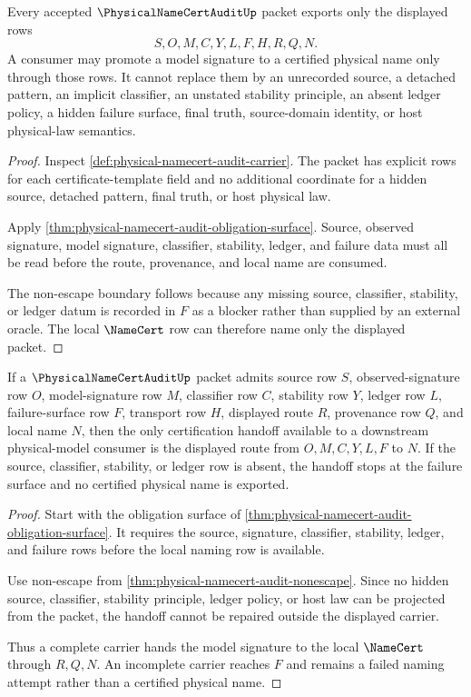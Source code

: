 \begin{theorem}
\label{thm:physical-namecert-audit-nonescape}
Every accepted $\PhysicalNameCertAuditUp$ packet exports only the displayed rows
$$
S,O,M,C,Y,L,F,H,R,Q,N.
$$
A consumer may promote a model signature to a certified physical name only through those rows. It cannot replace them by an unrecorded source, a detached pattern, an implicit classifier, an unstated stability principle, an absent ledger policy, a hidden failure surface, final truth, source-domain identity, or host physical-law semantics.
\end{theorem}
\begin{proof}
Inspect \autoref{def:physical-namecert-audit-carrier}. The packet has explicit rows for each certificate-template field and no additional coordinate for a hidden source, detached pattern, final truth, or host physical law.

Apply \autoref{thm:physical-namecert-audit-obligation-surface}. Source, observed signature, model signature, classifier, stability, ledger, and failure data must all be read before the route, provenance, and local name are consumed.

The non-escape boundary follows because any missing source, classifier, stability, or ledger datum is recorded in $F$ as a blocker rather than supplied by an external oracle. The local $\NameCert$ row can therefore name only the displayed packet.
\end{proof}

\begin{theorem}
\label{thm:physical-namecert-audit-certification-handoff}
If a $\PhysicalNameCertAuditUp$ packet admits source row $S$, observed-signature row $O$, model-signature row $M$, classifier row $C$, stability row $Y$, ledger row $L$, failure-surface row $F$, transport row $H$, displayed route $R$, provenance row $Q$, and local name $N$, then the only certification handoff available to a downstream physical-model consumer is the displayed route from $O,M,C,Y,L,F$ to $N$. If the source, classifier, stability, or ledger row is absent, the handoff stops at the failure surface and no certified physical name is exported.
\end{theorem}
\begin{proof}
Start with the obligation surface of \autoref{thm:physical-namecert-audit-obligation-surface}. It requires the source, signature, classifier, stability, ledger, and failure rows before the local naming row is available.

Use non-escape from \autoref{thm:physical-namecert-audit-nonescape}. Since no hidden source, classifier, stability principle, ledger policy, or host law can be projected from the packet, the handoff cannot be repaired outside the displayed carrier.

Thus a complete carrier hands the model signature to the local $\NameCert$ through $R,Q,N$. An incomplete carrier reaches $F$ and remains a failed naming attempt rather than a certified physical name.
\end{proof}

